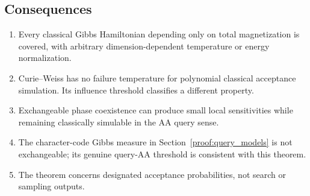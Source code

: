 \subsection{Consequences}\label{exch:heading-9}

\begin{enumerate}
\def\labelenumi{\arabic{enumi}.}
\tightlist
\item
  Every classical Gibbs Hamiltonian depending only on total
  magnetization is covered, with arbitrary dimension-dependent
  temperature or energy normalization.
\item
  Curie--Weiss has no failure temperature for polynomial classical
  acceptance simulation. Its influence threshold classifies a different
  property.
\item
  Exchangeable phase coexistence can produce small local sensitivities
  while remaining classically simulable in the AA query sense.
\item
  The character-code Gibbs measure in
  Section~\ref{proof:query_models} is not exchangeable; its
  genuine query-AA threshold is consistent with this theorem.
\item
  The theorem concerns designated acceptance probabilities, not search
  or sampling outputs.
\end{enumerate}
